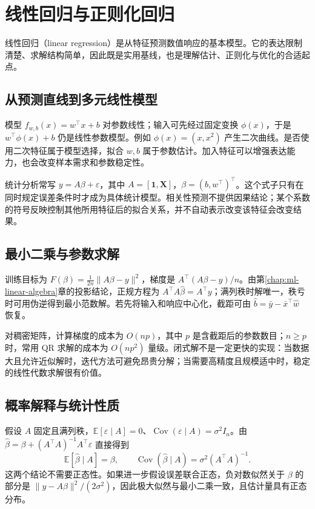 \setcounter{chapter}{6} %
\chapter{线性回归与正则化回归}
\label{chap:ml-regression}

线性回归（linear regression）是从特征预测数值响应的基本模型。它的表达限制清楚、求解结构简单，因此既是实用基线，也是理解估计、正则化与优化的合适起点。

\section{从预测直线到多元线性模型}

模型 $f_{w,b}(x)=w^\top x+b$ 对参数线性；输入可先经过固定变换 $\phi(x)$，于是 $w^\top\phi(x)+b$ 仍是线性参数模型。例如 $\phi(x)=(x,x^2)$ 产生二次曲线。是否使用二次特征属于模型选择，拟合 $w,b$ 属于参数估计。加入特征可以增强表达能力，也会改变样本需求和参数稳定性。

统计分析常写 $y=A\beta+\varepsilon$，其中 $A=[\mathbf1,\mathbf X]$，$\beta=(b,w^\top)^\top$。这个式子只有在同时规定误差条件时才成为具体统计模型。相关性预测不提供因果结论；某个系数的符号反映控制其他所用特征后的拟合关系，并不自动表示改变该特征会改变结果。

\section{最小二乘与参数求解}

训练目标为 $F(\beta)=\frac1{2n}\|A\beta-y\|^2$，梯度是 $A^\top(A\beta-y)/n$。由第\ref{chap:ml-linear-algebra}章的投影结论，正规方程为 $A^\top A\widehat\beta=A^\top y$；满列秩时解唯一，秩亏时可用伪逆得到最小范数解。若先将输入和响应中心化，截距可由 $\widehat b=\bar y-\bar x^\top\widehat w$ 恢复。

对稠密矩阵，计算梯度的成本为 $O(np)$，其中 $p$ 是含截距后的参数数目；$n\geq p$ 时，常用 QR 求解的成本为 $O(np^2)$ 量级。闭式解不是一定更快的实现：当数据大且允许近似解时，迭代方法可避免昂贵分解；当需要高精度且规模适中时，稳定的线性代数求解很有价值。

\section{概率解释与统计性质}

假设 $A$ 固定且满列秩，$\mathbb E[\varepsilon\mid A]=0$、$\operatorname{Cov}(\varepsilon\mid A)=\sigma^2I_n$。由
$\widehat\beta=\beta+(A^\top A)^{-1}A^\top\varepsilon$
直接得到
\[
 \mathbb E[\widehat\beta\mid A]=\beta,\qquad
 \operatorname{Cov}(\widehat\beta\mid A)=\sigma^2(A^\top A)^{-1}.
\]
这两个结论不需要正态性。如果进一步假设误差联合正态，负对数似然关于 $\beta$ 的部分是 $\|y-A\beta\|^2/(2\sigma^2)$，因此极大似然与最小二乘一致，且估计量具有正态分布。

